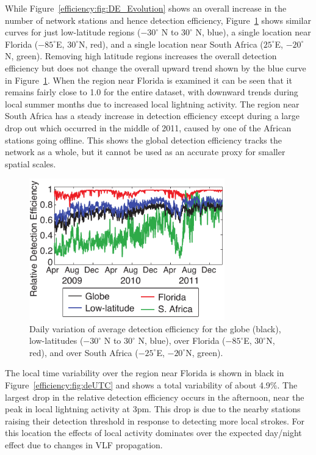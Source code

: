 While Figure~\ref{efficiency:fig:DE_Evolution} shows an overall increase in the number of network stations and hence detection efficiency, Figure~\ref{efficiency:fig:deTrendLocal} shows similar curves for just low-latitude regions ($-30^\circ$ N to $30^\circ$ N, blue), a single location near Florida ($-85^\circ$E, $30^\circ$N, red), and a single location near South Africa ($25^\circ$E, $-20^\circ$N, green).
Removing high latitude regions increases the overall detection efficiency but does not change the overall upward trend shown by the blue curve in Figure~\ref{efficiency:fig:deTrendLocal}.
When the region near Florida is examined it can be seen that it remains fairly close to 1.0 for the entire dataset, with downward trends during local summer months due to increased local lightning activity.
The region near South Africa has a steady increase in detection efficiency except during a large drop out which occurred in the middle of 2011, caused by one of the African stations going offline.
This shows the global detection efficiency tracks the network as a whole, but it cannot be used as an accurate proxy for smaller spatial scales.

\begin{figure}[ht!]
   \centering
\noindent\includegraphics[width=20pc]{efficiency/Figures/2012RS005049-p10.pdf} 
   \caption{Daily variation of average detection efficiency for the globe (black), low-latitudes ($-30^\circ$ N to $30^\circ$ N, blue), over Florida ($-85^\circ$E, $30^\circ$N, red), and over South Africa ($-25^\circ$E, $-20^\circ$N, green).}
   \label{efficiency:fig:deTrendLocal}
\end{figure}

The local time variability over the region near Florida is shown in black in Figure~\ref{efficiency:fig:deUTC} and shows a total variability of about 4.9\%.
The largest drop in the relative detection efficiency occurs in the afternoon, near the peak in local lightning activity at 3pm.
This drop is due to the nearby stations raising their detection threshold in response to detecting more local strokes.
For this location the effects of local activity dominates over the expected day/night effect due to changes in VLF propagation.

